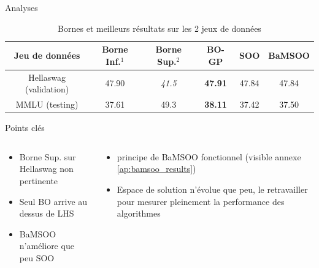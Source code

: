 \begin{frame}{Analyses}
    \begin{table}[h!]
        \centering
        \begin{tabular}{|c||c|c||c|c|c|}
        \hline
           Jeu de données  & Borne Inf.$^1$& Borne Sup.$^2$ & BO-GP & SOO & BaMSOO \\
        \hline
           Hellaswag (validation)  & 47.90 & \textit{41.5} & \textbf{47.91} & 47.84 & 47.84\\
           MMLU (testing) & 37.61 & 49.3 & \textbf{38.11} & 37.42 & 37.50 \\
        \hline
        \end{tabular}
        \caption{Bornes et meilleurs résultats sur les 2 jeux de données}
    \end{table}
    \vspace*{-5pt}{\footnotesize 1 : expérience avec LHS; 2 : Fine tuning par Meta}

    \begin{block}{Points clés}     
    \end{block}
    
    \vspace*{-15pt}
    \begin{columns}
        
        \begin{column}{0.45\textwidth} 
                \begin{itemize}
                    \item Borne Sup. sur Hellaswag non pertinente
                    \item Seul BO arrive au dessus de LHS
                    \item BaMSOO n'améliore que peu SOO
                \end{itemize}
        \end{column}  
            \begin{column}{0.45\textwidth}
                \begin{itemize}
                    \item principe de BaMSOO fonctionnel (visible annexe \ref{ap:bamsoo_results})
                    \item Espace de solution n'évolue que peu, le retravailler pour mesurer pleinement la performance des algorithmes
                \end{itemize}
            \end{column}          
    \end{columns}
    
\end{frame}

